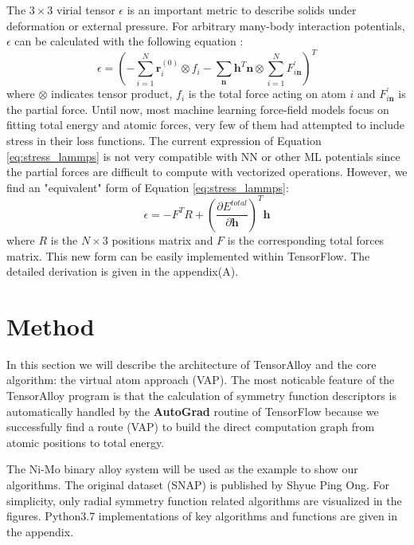 \documentclass[final,1p,times]{elsarticle}
\begin{document}
The $3 \times 3$ virial tensor $\epsilon$ is an important metric to 
describe solids under deformation or external pressure. For arbitrary many-body 
interaction potentials, $\epsilon$ can be calculated with the following equation
\cite{lammps_stress}:
\begin{equation}
\label{eq:stress_lammps}
\epsilon = \left(-\sum_{i=1}^{N}{\mathbf{r}_i^{(0)} \otimes f_i} - 
\sum_{\mathbf{n}}{\mathbf{h}^T\mathbf{n}} \otimes 
\sum_{i=1}^{N}{F^{\prime}_{i\mathbf{n}}}
\right)^T
\end{equation}
where $\otimes$ indicates tensor product, $f_i$ is the total 
force acting on atom $i$ and $F^{\prime}_{i\mathbf{n}}$ is the partial force. 
Until now, most machine learning force-field models focus on fitting total 
energy and atomic forces, very few of them\cite{DeePMD,DeePMD_rl,DeePMD_kit} had 
attempted to include stress in their loss functions. 
The current expression of Equation \ref{eq:stress_lammps} is not very compatible 
with NN or other ML potentials since the partial forces are difficult to compute 
with vectorized operations. However, we find an "equivalent" form 
of Equation \ref{eq:stress_lammps}:
\begin{equation}
\label{eq:stress}
\epsilon = -F^{T} R + 
\left(\frac{\partial E^{total}}{\partial \mathbf{h}}\right)^T \mathbf{h}
\end{equation}
where $R$ is the $N \times 3$ positions matrix and $F$ is the 
corresponding total forces matrix. This new form can be easily implemented 
within TensorFlow. The detailed derivation is given in the appendix(A).

% 
%
\section{Method}
\label{section:method}

In this section we will describe the architecture of TensorAlloy and the core 
algorithm: the virtual atom approach (VAP). The most noticable feature of the 
TensorAlloy program is that the calculation of symmetry function descriptors is 
automatically handled by the \textbf{AutoGrad}\cite{tensorflow} routine of 
TensorFlow because we successfully find a route (VAP) to build the direct 
computation graph from atomic positions to total energy.

The Ni-Mo binary alloy system will be used as the example to show our 
algorithms. The original dataset (SNAP) is published by Shyue Ping 
Ong\cite{SNAP_2018}. 
For simplicity, only radial symmetry function related algorithms are 
visualized in the figures. Python3.7 implementations of key algorithms and 
functions are given in the appendix. 
\end{document}
